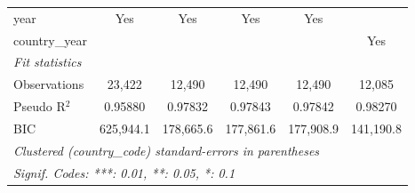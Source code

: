 \begin{tabular}{lccccc}
   year                              & Yes          & Yes            & Yes            & Yes            & \\  
   country\_year                     &              &                &                &                & Yes\\  
   \midrule
   \emph{Fit statistics}\\
   Observations                      & 23,422       & 12,490         & 12,490         & 12,490         & 12,085\\  
   Pseudo R$^2$                      & 0.95880      & 0.97832        & 0.97843        & 0.97842        & 0.98270\\  
   BIC                               & 625,944.1    & 178,665.6      & 177,861.6      & 177,908.9      & 141,190.8\\  
   \midrule \midrule
   \multicolumn{6}{l}{\emph{Clustered (country\_code) standard-errors in parentheses}}\\
   \multicolumn{6}{l}{\emph{Signif. Codes: ***: 0.01, **: 0.05, *: 0.1}}\\
\end{tabular}
\par\endgroup


